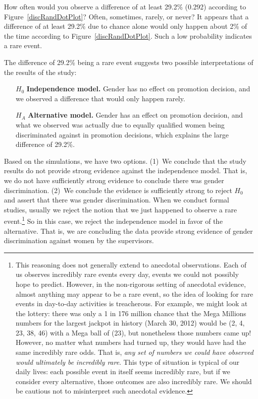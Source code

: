 \begin{example}{How often would you observe a difference of at least 29.2\% (0.292) according to Figure~\ref{discRandDotPlot}? Often, sometimes, rarely, or never?}
It appears that a difference of at least 29.2\% due to chance alone would only happen about 2\% of the time according to Figure~\ref{discRandDotPlot}. Such a low probability indicates a rare event.
\end{example}

\textC{\newpage}

The difference of 29.2\% being a rare event suggests two possible interpretations of the results of the study:
\begin{itemize}
\setlength{\itemsep}{0mm}
\item[$H_0$] \textbf{Independence model.} Gender has no effect on promotion decision, and we observed a difference that would only happen rarely.
\item[$H_A$] \textbf{Alternative model.} Gender has an effect on promotion decision, and what we observed was actually due to equally qualified women being discriminated against in promotion decisions, which explains the large difference of 29.2\%.
\end{itemize}
Based on the simulations, we have two options. (1)~We conclude that the study results do not provide strong evidence against the independence model. That is, we do not have sufficiently strong evidence to conclude there was gender discrimination. (2)~We conclude the evidence is sufficiently strong to reject $H_0$ and assert that there was gender discrimination. When we conduct formal studies, usually we reject the notion that we just happened to observe a rare event.\footnote{This reasoning does not generally extend to anecdotal observations. Each of us observes incredibly rare events every day, events we could not possibly hope to predict. However, in the non-rigorous setting of anecdotal evidence, almost anything may appear to be a rare event, so the idea of looking for rare events in day-to-day activities is treacherous. For example, we might look at the lottery: there was only a 1 in 176 million chance that the Mega Millions numbers for the largest jackpot in history (March 30, 2012) would be (2, 4, 23, 38, 46) with a Mega ball of (23), but nonetheless those numbers came up! However, no matter what numbers had turned up, they would have had the same incredibly rare odds. That is, \emph{any set of numbers we could have observed would ultimately be incredibly rare}. This type of situation is typical of our daily lives: each possible event in itself seems incredibly rare, but if we consider every alternative, those outcomes are also incredibly rare. We should be cautious not to misinterpret such anecdotal evidence.} So in this case, we reject the independence model in favor of the alternative. That is, we are concluding the data provide strong evidence of gender discrimination against women by the supervisors.

